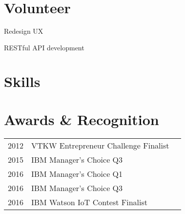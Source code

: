 \documentclass[]{resume}
\begin{document}
\begin{minipage}[t]{0.35\textwidth}

\section{Volunteer}

\begin{tightemize}
\item Redesign UX
\item RESTful API development
\end{tightemize}
\sectionsep



\section{Skills}


\sectionsep



\section{Awards \& Recognition} 
\begin{tabular}{rll}
2012 &  VTKW Entrepreneur Challenge Finalist\\
2015 &  IBM Manager's Choice Q3 \\
2016 & IBM Manager's Choice Q1 \\
2016 & IBM Manager's Choice Q3 \\
2016 & IBM Watson IoT Contest Finalist \\
\end{tabular}
\sectionsep


%
%

\end{minipage} 
\end{document}
